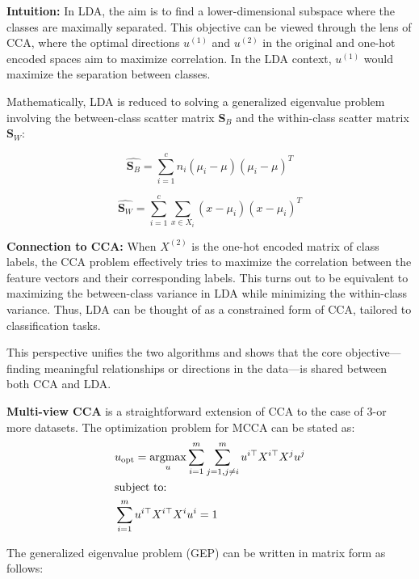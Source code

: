 \textbf{Intuition:} In LDA, the aim is to find a lower-dimensional subspace where the classes are maximally separated. This objective can be viewed through the lens of CCA, where the optimal directions \(u^{(1)}\) and \(u^{(2)}\) in the original and one-hot encoded spaces aim to maximize correlation. In the LDA context, \(u^{(1)}\) would maximize the separation between classes.

Mathematically, LDA is reduced to solving a generalized eigenvalue problem involving the between-class scatter matrix \(\mathbf{S}_B\) and the within-class scatter matrix \(\mathbf{S}_W\):

\[
    \hat{\mathbf{S}_B} = \sum_{i=1}^{c} n_i (\mu_i - \mu)(\mu_i - \mu)^T
\]

\[
    \hat{\mathbf{S}_W} = \sum_{i=1}^{c} \sum_{x \in X_i} (x - \mu_i)(x - \mu_i)^T
\]

\textbf{Connection to CCA:} When \(X^{(2)}\) is the one-hot encoded matrix of class labels, the CCA problem effectively tries to maximize the correlation between the feature vectors and their corresponding labels. This turns out to be equivalent to maximizing the between-class variance in LDA while minimizing the within-class variance. Thus, LDA can be thought of as a constrained form of CCA, tailored to classification tasks.

This perspective unifies the two algorithms and shows that the core objective—finding meaningful relationships or directions in the data—is shared between both CCA and LDA.

\textbf{Multi-view CCA} is a straightforward extension of CCA to the case of 3-or more datasets.
The optimization problem for MCCA can be stated as:
\begin{align}
     & u_{\text{opt}} = \underset{u}{\mathrm{argmax}} \sum_{i=1}^{m} \sum_{j=1, j \neq i}^{m} u^{i\top} X^{i\top} X^{j} u^{j} \\
     & \text{subject to:} \notag \\
     & \sum_{i=1}^{m} u^{i\top} X^{i\top} X^{i} u^{i} = 1 \notag
\end{align}

The generalized eigenvalue problem (GEP) can be written in matrix form as follows:

